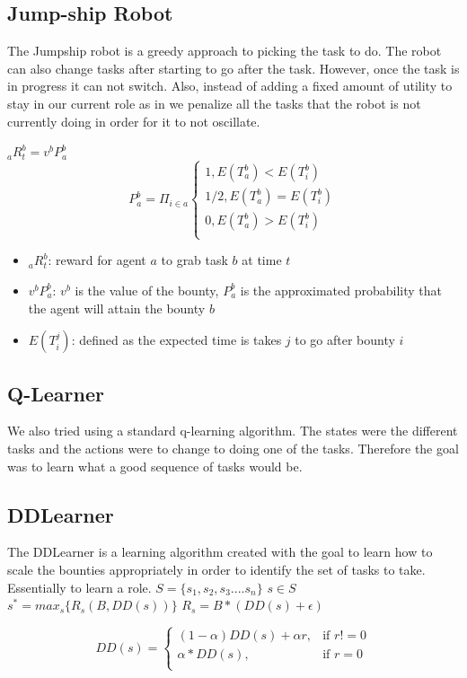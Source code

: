 \documentclass[twocolumn]{article}
\begin{document}
\subsection{Jump-ship Robot}
The Jumpship robot is a greedy approach to picking the task to do.  The robot can also change tasks after starting to go after the task.  However, once the task is in progress it can not switch.  Also, instead of adding a fixed amount of utility to stay in our current role as in \cite{Brusey2001} we penalize all the tasks that the robot is not currently doing in order for it to not oscillate.


$_aR_t^b = v^bP_a^b$
\[
P_a^b = \Pi_{i \in a} 
\begin{cases}
    1, E(T_a^b) <E(T_i^b)\\
    1/2, E(T_a^b) = E(T_i^b)\\
    0, E(T_a^b) >E(T_i^b)\\

\end{cases}
\]
\begin{itemize}
\item $_aR_t^b$: reward for agent $a$  to grab task $b$ at time $t$
\item $v^bP_a^b$: $v^b$ is the value of the bounty,  $P_a^b$ is the approximated probability that the agent will attain the bounty $b$ 
\item $E(T_i^j)$:  defined as the expected time is takes $j$ to go after bounty $i$
\end{itemize}

\subsection{Q-Learner}
We also tried using a standard q-learning algorithm.  The states were the different tasks and the actions were to change to doing one of the tasks.  Therefore the goal was to learn what a good sequence of tasks would be.
\subsection{DDLearner}
The DDLearner is a learning algorithm created with the goal to learn how to scale the bounties appropriately in order to identify the set of tasks to take.  Essentially to learn a role.  
$S = \{s_1,s_2,s_3....s_n\}$
$s \in S$
$s^* = max_s\{R_s(B,DD(s))\}$
$R_s=B*(DD(s)+\epsilon)$

\[ DD(s) = 
\begin{cases}
     (1-\alpha)DD(s)+ \alpha r,& \text{if } r!=0\\
     \alpha*DD(s),& \text{if } r=0\\

\end{cases}
\]
\end{document}
